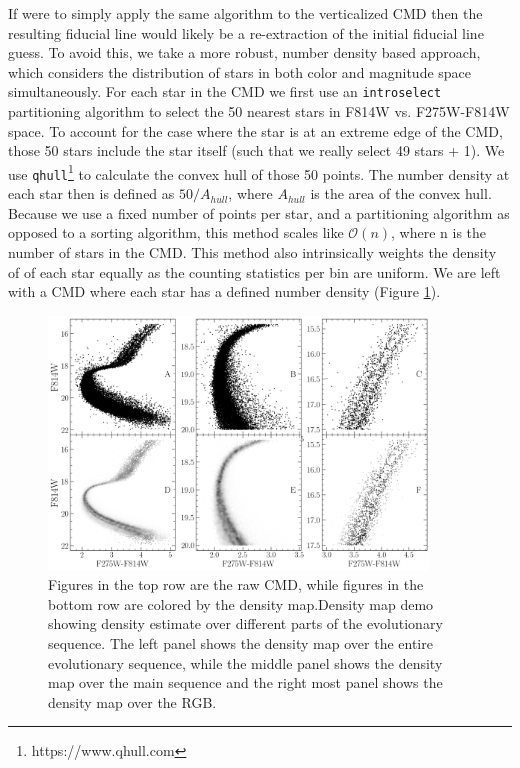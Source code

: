 If \fidanka were to simply apply the same algorithm to the verticalized CMD
then the resulting fiducial line would likely be a re-extraction of the initial
fiducial line guess. To avoid this, we take a more robust, number density based
approach, which considers the distribution of stars in both color and magnitude
space simultaneously. For each star in the CMD we first use an
\texttt{introselect} partitioning algorithm to select the 50 nearest stars in
F814W vs. F275W-F814W space. To account for the case where the star is at an
extreme edge of the CMD, those 50 stars include the star itself (such that we
really select 49 stars + 1). We use
\texttt{qhull}\footnote{https://www.qhull.com}\citep{Barber1996} to calculate
the convex hull of those 50 points. The number density at each star then is
defined as $50/A_{hull}$, where $A_{hull}$ is the area of the convex hull.
Because we use a fixed number of points per star, and a partitioning algorithm
as opposed to a sorting algorithm, this method scales like $\mathcal{O}(n)$,
where n is the number of stars in the CMD. This method also intrinsically
weights the density of of each star equally as the counting statistics per bin
are uniform. We are left with a CMD where each star has a defined number
density (Figure \ref{densityMapDemo}).

\begin{figure}
	\centering
	\includegraphics[width=0.9\textwidth]{figures/ngc2808/notebookFigures/DensityMapDemo.png}
  \caption{Figures in the top row are the raw CMD, while figures in the bottom
  row are colored by the density map.Density map demo showing density estimate
  over different parts of the evolutionary sequence. The left panel shows the
  density map over the entire evolutionary sequence, while the middle panel
  shows the density map over the main sequence and the right most panel shows
  the density map over the RGB. }
	\label{densityMapDemo}
\end{figure}

